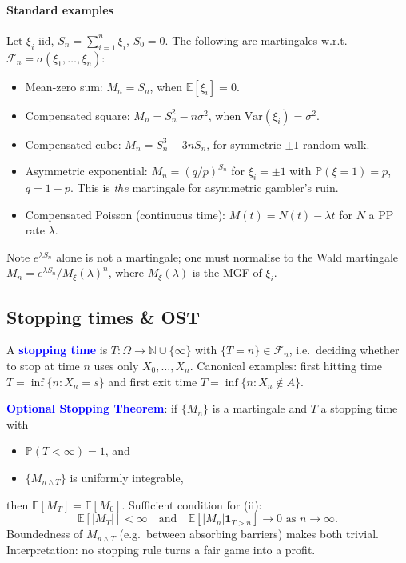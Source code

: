 \paragraph{Standard examples}
Let $\xi_i$ iid, $S_n = \sum_{i=1}^n \xi_i$, $S_0 = 0$. The following are
martingales w.r.t.\ $\mathcal{F}_n = \sigma(\xi_1, \ldots, \xi_n)$:
\begin{itemize}
  \item \textcolor{Bittersweet}{Mean-zero sum}: $M_n = S_n$, when
    $\mathbb{E}[\xi_i] = 0$.
  \item \textcolor{Bittersweet}{Compensated square}: $M_n = S_n^2 - n\sigma^2$,
    when $\mathrm{Var}(\xi_i) = \sigma^2$.
  \item \textcolor{Bittersweet}{Compensated cube}: $M_n = S_n^3 - 3 n S_n$,
    for symmetric $\pm 1$ random walk.
  \item \textcolor{Bittersweet}{Asymmetric exponential}: $M_n = (q/p)^{S_n}$
    for $\xi_i = \pm 1$ with $\mathbb{P}(\xi = 1) = p$, $q = 1-p$. This is
    \emph{the} martingale for asymmetric gambler's ruin.
  \item \textcolor{Bittersweet}{Compensated Poisson} (continuous time):
    $M(t) = N(t) - \lambda t$ for $N$ a PP rate $\lambda$.
\end{itemize}
Note $e^{\lambda S_n}$ alone is \textcolor{Bittersweet}{not} a martingale; one
must normalise to the \textcolor{Bittersweet}{Wald martingale}
$M_n = e^{\lambda S_n} / M_\xi(\lambda)^n$, where $M_\xi(\lambda)$ is the MGF
of $\xi_i$.

\subsection{Stopping times \& OST}
A \textcolor{Blue}{\textbf{stopping time}} is $T : \Omega \to \mathbb{N} \cup
\{\infty\}$ with $\{T = n\} \in \mathcal{F}_n$, i.e.\ deciding whether to stop
at time $n$ uses only $X_0, \ldots, X_n$. Canonical examples: first hitting
time $T = \inf\{n : X_n = s\}$ and first exit time
$T = \inf\{n : X_n \notin A\}$.

\textcolor{Blue}{\textbf{Optional Stopping Theorem}}: if $\{M_n\}$ is a
martingale and $T$ a stopping time with
\begin{itemize}
  \item[(i)] \textcolor{Bittersweet}{$\mathbb{P}(T < \infty) = 1$}, and
  \item[(ii)] $\{M_{n \wedge T}\}$ is \textcolor{Bittersweet}{uniformly integrable},
\end{itemize}
then $\mathbb{E}[M_T] = \mathbb{E}[M_0]$. \textcolor{Bittersweet}{Sufficient
condition} for (ii):
\[\mathbb{E}[|M_T|] < \infty \quad \text{and} \quad
  \mathbb{E}[|M_n| \mathbf{1}_{T > n}] \to 0 \text{ as } n \to \infty.\]
Boundedness of $M_{n \wedge T}$ (e.g.\ between absorbing barriers) makes both
trivial. Interpretation: no stopping rule turns a fair game into a profit.


